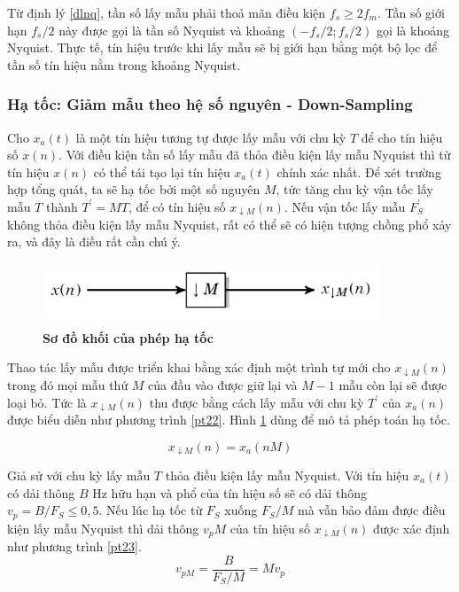 Từ định lý \ref{dlnq}, tần số lấy mẫu phải thoả mãn điều kiện $f_s \geq 2f_m$. Tần số giới hạn $f_s/2$ này được gọi là tần số Nyquist và khoảng $(-f_s/2; f_s/2)$ gọi là khoảng Nyquist. Thực tế, tín hiệu trước khi lấy mẫu sẽ bị giới hạn bằng một bộ lọc để tần số tín hiệu nằm trong khoảng Nyquist.

\subsubsection{Hạ tốc: Giảm mẫu theo hệ số nguyên - Down-Sampling} \label{downsample}
Cho $x_a(t)$ là một tín hiệu tương tự được lấy mẫu với chu kỳ $T$
để cho tín hiệu số $x(n)$. Với điều kiện tần số lấy mẫu đã thỏa điều kiện lấy
mẫu Nyquist thì từ tín hiệu $x(n)$ có thể tái tạo lại tín hiệu $x_a(t)$ chính xác nhất. Để xét trường hợp tổng quát, ta sẽ hạ tốc bởi một số nguyên $M$, tức tăng chu kỳ vận tốc lấy mẫu $T$ thành $T^\prime=MT$, để có tín hiệu số $x_{\downarrow M}(n)$. Nếu vận tốc lấy mẫu $F^\prime_S$ không thỏa điều kiện lấy mẫu Nyquist, rất có thể sẽ có hiện tượng chồng phổ xảy ra, và đây là điều rất cần chú ý. \cite{xulytinhieusobook}\cite{rao2018digital}

\begin{figure}[H]
    \centering
    \includegraphics[width=10cm]{Images/Chuong2/downsampling-top.png}
    \caption[Sơ đồ khối của phép hạ tốc]{\bfseries \fontsize{12pt}{0pt}\selectfont Sơ đồ khối của phép hạ tốc}
    \label{downsampling-top}
\end{figure}
Thao tác lấy mẫu được triển khai bằng xác định một trình tự mới cho $x_{\downarrow M}(n)$ trong đó mọi mẫu thứ $M$ của đầu vào được giữ lại và $M-1$ mẫu còn lại sẽ được loại bỏ. Tức là $x_{\downarrow M}(n)$ thu được bằng cách lấy mẫu với chu kỳ $T^\prime$ của $x_a(n)$ được biểu diễn như phương trình \ref{pt22}. Hình \ref{downsampling-top} dùng để mô tả phép toán hạ tốc.

\begin{equation} \label{pt22}
     x_{\downarrow M}(n) = x_a(nM)
\end{equation}

Giả sử với chu kỳ lấy mẫu $T$ thỏa điều kiện lấy mẫu Nyquist. Với tín hiệu $x_a(t)$ có dải thông $B$ Hz hữu hạn và phổ của tín hiệu số sẽ có dải thông $v_p = B/F_S \leq 0,5$. Nếu lúc hạ tốc từ $F_S$ xuống $F_S/M$ mà vẫn bảo đảm được điều kiện lấy mẫu Nyquist thì dải thông $v_pM$ của tín hiệu số $x_{\downarrow M}(n)$ được xác định như phương trình \ref{pt23}.
\begin{equation} \label{pt23}
     v_{pM} = \frac{B}{F_S/M} = Mv_p
\end{equation}

